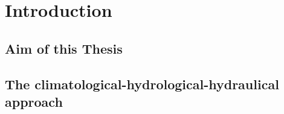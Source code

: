 \chapter{Introduction}

\section{Aim of this Thesis}

\section{The climatological-hydrological-hydraulical approach}

